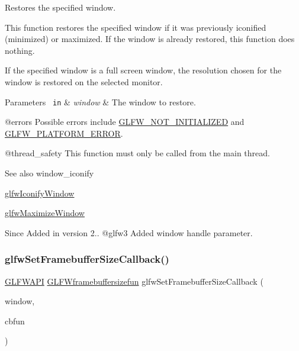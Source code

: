 Restores the specified window. 

This function restores the specified window if it was previously iconified (minimized) or maximized. If the window is already restored, this function does nothing.

If the specified window is a full screen window, the resolution chosen for the window is restored on the selected monitor.


\begin{DoxyParams}[1]{Parameters}
\mbox{\texttt{ in}}  & {\em window} & The window to restore.\\
\hline
\end{DoxyParams}
@errors Possible errors include \mbox{\hyperlink{group__errors_ga2374ee02c177f12e1fa76ff3ed15e14a}{G\+L\+F\+W\+\_\+\+N\+O\+T\+\_\+\+I\+N\+I\+T\+I\+A\+L\+I\+Z\+ED}} and \mbox{\hyperlink{group__errors_gad44162d78100ea5e87cdd38426b8c7a1}{G\+L\+F\+W\+\_\+\+P\+L\+A\+T\+F\+O\+R\+M\+\_\+\+E\+R\+R\+OR}}.

@thread\+\_\+safety This function must only be called from the main thread.

\begin{DoxySeeAlso}{See also}
window\+\_\+iconify 

\mbox{\hyperlink{group__window_ga24274e3c6ecd44e11fec5e6b66e4d7f3}{glfw\+Iconify\+Window}} 

\mbox{\hyperlink{group__window_ga4f825a55367d3fabde3d06e7f30128e8}{glfw\+Maximize\+Window}}
\end{DoxySeeAlso}
\begin{DoxySince}{Since}
Added in version 2.. @glfw3 Added window handle parameter. 
\end{DoxySince}
\mbox{\label{group__window_gad766bcdb4465f9c6c62e5d8ca7cfba56}} 
\subsubsection{\texorpdfstring{glfwSetFramebufferSizeCallback()}{glfwSetFramebufferSizeCallback()}}
{\footnotesize\ttfamily \mbox{\hyperlink{glfw3_8h_a56da5036b2cc259351ae22fd6439bb47}{G\+L\+F\+W\+A\+PI}} \mbox{\hyperlink{group__window_ga3e218ef9ff826129c55a7d5f6971a285}{G\+L\+F\+Wframebuffersizefun}} glfw\+Set\+Framebuffer\+Size\+Callback (\begin{DoxyParamCaption}\item[{\mbox{\hyperlink{group__window_ga3c96d80d363e67d13a41b5d1821f3242}{G\+L\+F\+Wwindow}} $\ast$}]{window,  }\item[{\mbox{\hyperlink{group__window_ga3e218ef9ff826129c55a7d5f6971a285}{G\+L\+F\+Wframebuffersizefun}}}]{cbfun }\end{DoxyParamCaption})}



